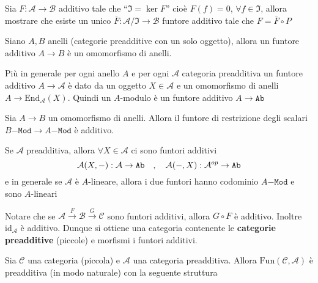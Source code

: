 \begin{eser}{}
    Sia \(F : \mathcal{A} \to \mathcal{B}\) additivo tale che ``\(\mathfrak{I} = \ker F\)'' cioè \(F{(f)} = 0 \), \(\forall f \in \mathfrak{I}\), allora mostrare che esiste un unico \(\overline{F} : \mathcal{A}/\mathfrak{I} \to \mathcal{B}\) funtore additivo tale che \(F = \overline{F} \circ P\) 
\end{eser}

\begin{example}{}
    Siano \(A, B\) anelli (categorie preadditive con un solo oggetto), allora un
    funtore additivo \(A\to B\) è un omomorfismo di anelli.

    Più in generale per ogni anello \(A\) e per ogni \(\mathcal{A}\) categoria
    preadditiva un funtore additivo \( A \to \mathcal{A}\) è dato da un oggetto
    \(X \in \mathcal{A}\) e un omomorfismo di anelli \(A \to \mathrm{End}_\mathcal{A}{(X)}\).
    Quindi un \(A\)-modulo è un funtore additivo \(A \to \mathtt{Ab}\) 
\end{example}

\begin{example}{}
    Sia \(A\to B\) un omomorfismo di anelli. Allora il funtore di restrizione
    degli scalari \(B\mathtt{-Mod} \to A\mathtt{-Mod}\) è additivo.
\end{example}

\begin{example}{}
    Se \(\mathcal{A}\) preadditiva, allora \(\forall X \in \mathcal{A}\) ci sono
    funtori additivi
    \[
      \mathcal{A}{(X, \--)} : \mathcal{A} \to \mathtt{Ab} \quad , \quad \mathcal{A}{(\-- , X)} : \mathcal{A}^{op} \to \mathtt{Ab}
    \]
    e in generale se \(
    \mathcal{A}\) è \(A\)-lineare, allora i due funtori hanno codominio \(A\mathtt{-Mod}\) 
    e sono \(A\)-lineari
\end{example}

Notare che se \(\mathcal{A} \overset{F}{\to } \mathcal{B} \overset{G}{\to } \mathcal{\mathcal{C}}\) 
sono funtori additivi, allora \(G \circ F\) è additivo.
Inoltre \(\mathrm{id}_\mathcal{A}\) è additivo. 
Dunque si ottiene una categoria contenente le \textbf{categorie preadditive}
(piccole) e morfismi i funtori additivi.

    Sia \(\mathcal{\mathcal{C}}\) una categoria (piccola) e \(\mathcal{A}\) una categoria
    preadditiva. Allora \(\mathrm{Fun}{(\mathcal{\mathcal{C}}, \mathcal{A})}\) è
    preadditiva (in modo naturale) con la seguente struttura

